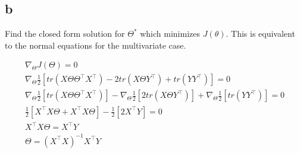 \documentclass[12pt]{article}
\begin{document}
\subsection{b}
Find the closed form solution for $\Theta^{*}$ which minimizes $J(\theta)$. This is equivalent to the normal equations for the multivariate case.
\begin{qsolve}
    \begin{gather*}
        \nabla_\Theta J(\Theta) = 0 \\
        \nabla_\Theta \frac{1}{2}  [tr(X \Theta \Theta^\top X^\top) - 2 tr(X \Theta Y^\top) + tr(Y Y^\top)] = 0 \\
        \nabla_\Theta \frac{1}{2}  [tr(X \Theta \Theta^\top X^\top)] - \nabla_\Theta \frac{1}{2}  [2 tr(X \Theta Y^\top)] + \nabla_\Theta \frac{1}{2}  [tr(Y Y^\top)] = 0 \\
        \frac{1}{2}  [X^\top X \Theta + X^\top X \Theta] - \frac{1}{2}  [2 X^\top Y] = 0 \\
        X^\top X \Theta = X^\top Y \\
        \Theta = (X^\top X)^{-1} X^\top Y \\
    \end{gather*}
\end{qsolve}
\end{document}
